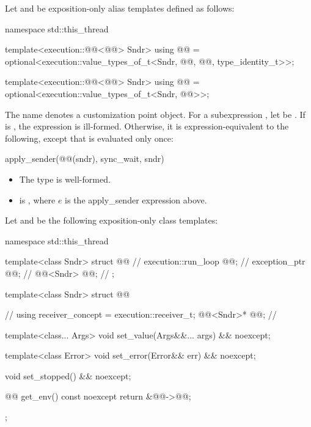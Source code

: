 \pnum
Let  and
be exposition-only alias templates defined as follows:
\begin{codeblock}
namespace std::this_thread {
  template<execution::@@<@@> Sndr>
    using @@ =
      optional<execution::value_types_of_t<Sndr, @@, @@,
               type_identity_t>>;

  template<execution::@@<@@> Sndr>
    using @@ =
      optional<execution::value_types_of_t<Sndr, @@>>;
}
\end{codeblock}

\pnum
The name  denotes a customization point object.
For a subexpression , let  be .
If 
is ,
the expression  is ill-formed.
Otherwise, it is expression-equivalent to the following,
except that  is evaluated only once:
\begin{codeblock}
apply_sender(@@(sndr), sync_wait, sndr)
\end{codeblock}
\mandates
\begin{itemize}
\item
The type  is well-formed.
\item
{}
is , where $e$ is the apply_sender expression above.
\end{itemize}

\pnum
Let  and 
be the following exposition-only class templates:
\begin{codeblock}
namespace std::this_thread {
  template<class Sndr>
  struct @@ {                                      // \expos
    execution::run_loop @@;                                   // \expos
    exception_ptr @@;                                        // \expos
    @@<Sndr> @@;                         // \expos
  };

  template<class Sndr>
  struct @@ {                                   // \expos
    using receiver_concept = execution::receiver_t;
    @@<Sndr>* @@;                               // \expos

    template<class... Args>
    void set_value(Args&&... args) && noexcept;

    template<class Error>
    void set_error(Error&& err) && noexcept;

    void set_stopped() && noexcept;

    @@ get_env() const noexcept { return {&@@->@@}; }
  };
}
\end{codeblock}

